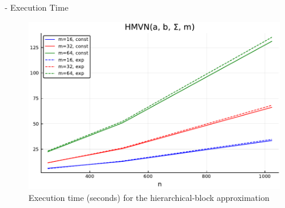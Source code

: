 \begin{frame}[allowframebreaks]{\subsecname - Execution Time}
	\begin{figure}
		\centering
		\includegraphics[width=0.8\linewidth]{figs/table3_m1.pdf}
		\caption{Execution time (seconds) for the hierarchical-block approximation}\label{fig:table3_htime}
	\end{figure}

	\framebreak


\end{frame}
